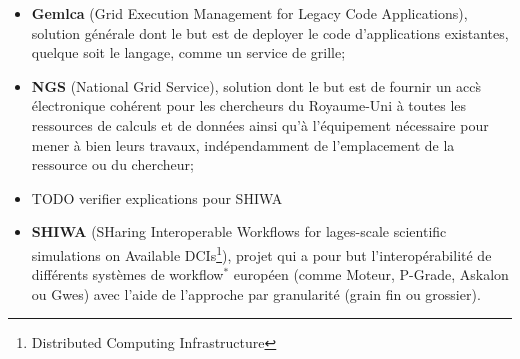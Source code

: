 \begin{itemize}
	\item \textbf{Gemlca} (Grid Execution Management for Legacy Code Applications), solution g\'en\'erale dont le but est de deployer le code d'applications existantes, quelque soit le langage, comme un service de grille;
	\item \textbf{NGS} (National Grid Service), solution dont le but est de fournir un acc\`s \'electronique coh\'erent pour les chercheurs du Royaume-Uni \`a toutes les ressources de calculs et de donn\'ees ainsi qu'\`a l'\'equipement n\'ecessaire pour mener \`a bien leurs travaux, ind\'ependamment de l'emplacement de la ressource ou du chercheur;
	\item TODO verifier explications pour SHIWA
	\item \textbf{SHIWA} (SHaring Interoperable Workflows for lages-scale scientific simulations on Available DCIs\protect\footnote{Distributed Computing Infrastructure}), projet qui a pour but l'interop\'erabilit\'e de diff\'erents syst\`emes de workflow$^*$ europ\'een (comme Moteur, P-Grade, Askalon ou Gwes) avec l'aide de l'approche par granularit\'e (grain fin ou grossier).

\end{itemize}

\clearpage
